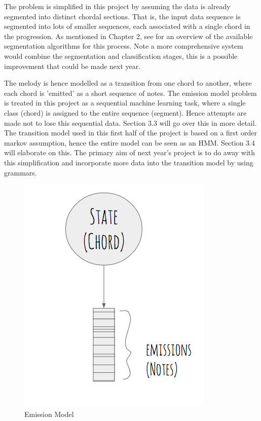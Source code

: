 \documentclass[bsc,singlespacing,parskip,deptreport,twoside,frontabs]{infthesis}
\begin{document}
The problem is simplified in this project by assuming the data is already segmented into distinct chordal sections. That is, the input data sequence is segmented into lots of smaller sequences, each associated with a single chord in the progression. As mentioned in Chapter 2, see \cite{pardo2002algorithms} for an overview of the available segmentation algorithms for this process. Note a more comprehensive system would combine the segmentation and classification stages, this is a possible improvement that could be made next year.

The melody is hence modelled as a transition from one chord to another, where each chord is 'emitted' as a short sequence of notes. The emission model problem is treated in this project as a sequential machine learning task, where a single class (chord) is assigned to the entire sequence (segment). Hence attempts are made not to lose this sequential data. Section 3.3 will go over this in more detail. The transition model used in this first half of the project is based on a first order markov assumption, hence the entire model can be seen as an HMM. Section 3.4 will elaborate on this. The primary aim of next year's project is to do away with this simplification and incorporate more data into the transition model by using grammars.

\begin{figure}
  \caption{Emission Model}
  \centering
    \includegraphics[scale=0.5]{state}
\end{figure}
\end{document}

